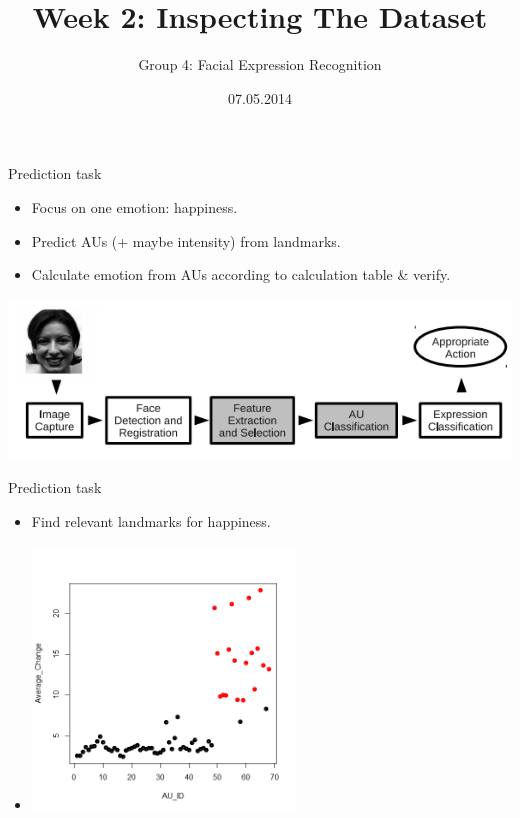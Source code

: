 \documentclass[xcolor=dvipsnames]{beamer}
\title{Week 2: Inspecting The Dataset}
\author{Group 4: Facial Expression Recognition}
\date{07.05.2014}
\begin{document}
\maketitle{}

\begin{frame}{Prediction task}
  \begin{itemize}
    \item Focus on one emotion: happiness.
    \item Predict AUs (+ maybe intensity) from landmarks.
    \item Calculate emotion from AUs according to calculation table \& verify.
  \end{itemize}
  \centering
  \includegraphics[width=\textwidth]{prediction_process}
\end{frame}

\begin{frame}{Prediction task}
  \begin{itemize}
    \item Find relevant landmarks for happiness.
    \item[] \includegraphics[height=7cm]{landmark_change}
  \end{itemize}
\end{frame}
\end{document}
